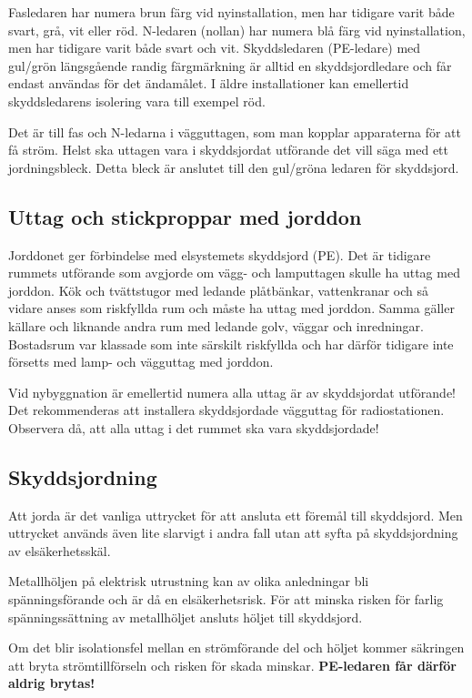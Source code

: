 Fasledaren har numera brun färg vid nyinstallation, men har tidigare varit
både svart, grå, vit eller röd.
N-ledaren (nollan) har numera blå färg vid nyinstallation, men har tidigare
varit både svart och vit.
Skyddsledaren (PE-ledare) med gul/grön längsgående randig färgmärkning är
alltid en skyddsjordledare och får endast användas för det ändamålet.
I äldre installationer kan emellertid skyddsledarens isolering vara till
exempel röd.

Det är till fas och N-ledarna i vägguttagen, som man kopplar apparaterna för
att få ström.
Helst ska uttagen vara i skyddsjordat utförande det vill säga med ett
jordningsbleck.
Detta bleck är anslutet till den gul/gröna ledaren för skyddsjord.

\subsection{Uttag och stickproppar med jorddon}

Jorddonet ger förbindelse med elsystemets skyddsjord (PE).
Det är tidigare rummets utförande som avgjorde om vägg- och lamputtagen skulle
ha uttag med jorddon.
Kök och tvättstugor med ledande plåtbänkar, vattenkranar och så vidare anses
som riskfyllda rum och måste ha uttag med jorddon.
Samma gäller källare och liknande andra rum med ledande golv, väggar och
inredningar.
Bostadsrum var klassade som inte särskilt riskfyllda och har därför tidigare
inte försetts med lamp- och vägguttag med jorddon.

Vid nybyggnation är emellertid numera alla uttag är av skyddsjordat utförande!
Det rekommenderas att installera skyddsjordade vägguttag för radiostationen.
Observera då, att alla uttag i det rummet ska vara skyddsjordade!

\subsection{Skyddsjordning}

Att jorda är det vanliga uttrycket för att ansluta ett föremål till skyddsjord.
Men uttrycket används även lite slarvigt i andra fall utan att syfta på
skyddsjordning av elsäkerhetsskäl.

Metallhöljen på elektrisk utrustning kan av olika anledningar bli
spänningsförande och är då en elsäkerhetsrisk.
För att minska risken för farlig spänningssättning av metallhöljet ansluts
höljet till skyddsjord.

\begin{center}
\begin{minipage}{0.19\columnwidth}
\Huge{\selectfont{}\relax}
\end{minipage}
\begin{minipage}{0.7\columnwidth}
Om det blir isolationsfel mellan en strömförande del och höljet kommer
säkringen att bryta strömtillförseln och risken för skada minskar.
\textbf{PE-ledaren får därför aldrig brytas!}
\end{minipage}
\end{center}


